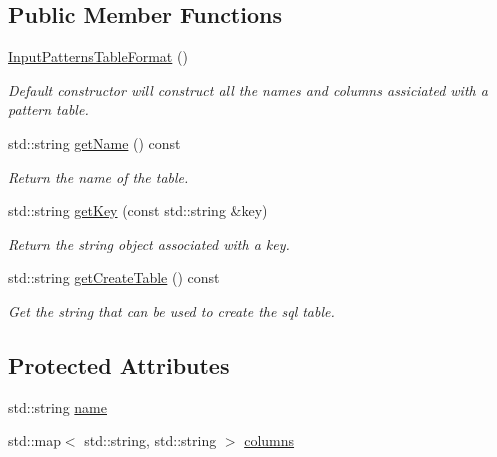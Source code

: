 \subsection*{\-Public \-Member \-Functions}
\begin{DoxyCompactItemize}
\item 
\hyperlink{structcryomesh_1_1manager_1_1InputPatternsTableFormat_a0e64ea9f3ebd45a2549b2edcfb226034}{\-Input\-Patterns\-Table\-Format} ()
\begin{DoxyCompactList}\small\item\em \-Default constructor will construct all the names and columns assiciated with a pattern table. \end{DoxyCompactList}\item 
std\-::string \hyperlink{structcryomesh_1_1manager_1_1TableFormat_a3e797d6130c6b0745a1fac799c25677a}{get\-Name} () const 
\begin{DoxyCompactList}\small\item\em \-Return the name of the table. \end{DoxyCompactList}\item 
std\-::string \hyperlink{structcryomesh_1_1manager_1_1TableFormat_a2256ce39471582b92bf7cbb6eec74d30}{get\-Key} (const std\-::string \&key)
\begin{DoxyCompactList}\small\item\em \-Return the string object associated with a key. \end{DoxyCompactList}\item 
std\-::string \hyperlink{structcryomesh_1_1manager_1_1TableFormat_a898ae0d0c5490ccdf71aec5156b10fcc}{get\-Create\-Table} () const 
\begin{DoxyCompactList}\small\item\em \-Get the string that can be used to create the sql table. \end{DoxyCompactList}\end{DoxyCompactItemize}
\subsection*{\-Protected \-Attributes}
\begin{DoxyCompactItemize}
\item 
std\-::string \hyperlink{structcryomesh_1_1manager_1_1TableFormat_ab49912897ccb7fd0f8d42f1cc21332e8}{name}
\item 
std\-::map$<$ std\-::string, \*
std\-::string $>$ \hyperlink{structcryomesh_1_1manager_1_1TableFormat_a29ab6f4cfc0c56da1fa461ea665a1b61}{columns}
\end{DoxyCompactItemize}


